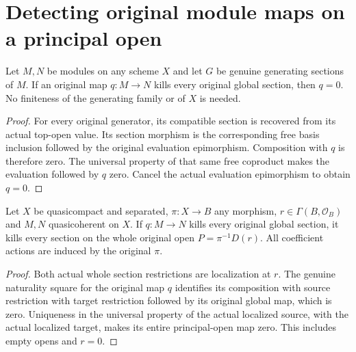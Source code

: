 \section{Detecting original module maps on a principal open}

\begin{lemma}
\label{lem:scheme-module-generators-detect-zero}
\leanok
{}
Let $M,N$ be modules on any scheme $X$ and let $G$ be genuine
generating sections of $M$. If an original map $q:M\to N$ kills
every original global section, then $q=0$. No finiteness of the
generating family or of $X$ is needed.
\end{lemma}
\begin{proof}
For every original generator, its compatible section is recovered
from its actual top-open value. Its section morphism is the
corresponding free basis inclusion followed by the original
evaluation epimorphism. Composition with $q$ is therefore zero.
The universal property of that same free coproduct makes the
evaluation followed by $q$ zero. Cancel the actual evaluation
epimorphism to obtain $q=0$.
\end{proof}

\begin{lemma}
\label{lem:scheme-module-principal-map-zero}
\leanok
{}
Let $X$ be quasicompact and separated, $\pi:X\to B$ any morphism,
$r\in\Gamma(B,\mathcal O_B)$ and $M,N$ quasicoherent on $X$.
If $q:M\to N$ kills every original global section, it kills
every section on the whole original open $P=\pi^{-1}D(r)$.
All coefficient actions are induced by the original $\pi$.
\end{lemma}
\begin{proof}
Both actual whole section restrictions are localization at $r$.
The genuine naturality square for the original map $q$ identifies
its composition with source restriction with target restriction
followed by its original global map, which is zero. Uniqueness
in the universal property of the actual localized source, with
the actual localized target, makes its entire principal-open
map zero. This includes empty opens and $r=0$.
\end{proof}

